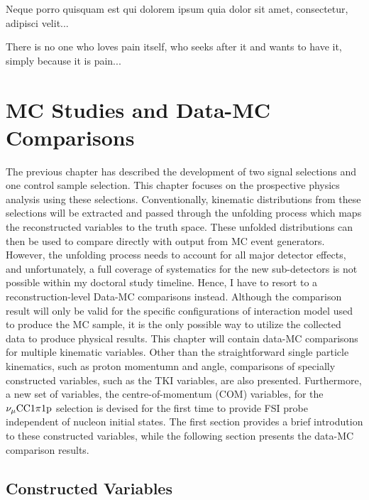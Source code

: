 \begin{savequote}[8cm]
\textlatin{Neque porro quisquam est qui dolorem ipsum quia dolor sit amet, consectetur, adipisci velit...}

There is no one who loves pain itself, who seeks after it and wants to have it, simply because it is pain...
\end{savequote}

\chapter{\label{ch:5-mcdata}MC Studies and Data-MC Comparisons} 

\minitoc

The previous chapter has described the development of two signal selections and one control sample selection. This chapter focuses on the prospective physics analysis using these selections.
Conventionally, kinematic distributions from these selections will be extracted and passed through the unfolding process which maps the reconstructed variables to the truth space. 
These unfolded distributions can then be used to compare directly with output from MC event generators.
However, the unfolding process needs to account for all major detector effects, and unfortunately, a full coverage of systematics for the new sub-detectors is not possible within my doctoral study timeline.
Hence, I have to resort to a reconstruction-level Data-MC comparisons instead.
Although the comparison result will only be valid for the specific configurations of interaction model used to produce the MC sample, it is the only possible way to utilize the collected data to produce physical results.
This chapter will contain data-MC comparisons for multiple kinematic variables. 
Other than the straightforward single particle kinematics, such as proton momentumn and angle, comparisons of specially constructed variables, such as the TKI variables, are also presented. 
Furthermore, a new set of variables, the centre-of-momentum (COM) variables, for the $\nu_{\mu}\textrm{CC}1\pi1\textrm{p}$ selection is devised for the first time to provide FSI probe independent of nucleon initial states.
The first section provides a brief introdution to these constructed variables, while the following section presents the data-MC comparison results.

\section{Constructed Variables}
